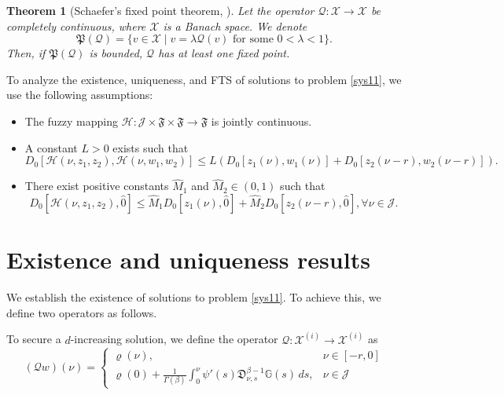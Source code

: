 \documentclass[10pt,a4paper]{amsart}
\numberwithin{equation}{section}
\newtheorem{theorem}[theo]{Theorem}
\begin{document}
\begin{theorem}[Schaefer's fixed point theorem, \cite{smar}] \label{theo3}
Let the operator $\mathcal{Q}: \mathcal{X} \to \mathcal{X}$ be completely continuous, 
where $\mathcal{X}$ is a Banach space. We denote
$$
\mathfrak{P}(\mathcal{Q})=\{v \in \mathcal{X}
\mid v=\lambda \mathcal{Q}(v) \text { for some } 0<\lambda<1\} .
$$
Then, if $\mathfrak{P}(\mathcal{Q})$ is bounded, $\mathcal{Q}$ has at least one fixed 
point.
\end{theorem}


To analyze the existence, uniqueness, and FTS of solutions to problem \eqref{sys11}, 
we use the following assumptions:
\begin{itemize}
\item[(A1)] The fuzzy mapping \(\mathcal{H} : \mathcal{J} \times \mathfrak{F} 
\times \mathfrak{F} \to \mathfrak{F}\) is jointly continuous.

\item[(A2)] A constant \(L > 0\) exists such that
$$
D_0[\mathcal{H}(\nu , z_{1}, z_{2}), \mathcal{H}(\nu , w_{1}, w_{2})] \leq L(D_0[z_{1}(\nu ), w_{1}(\nu )]+D_0[z_{2}(\nu - r), w_{2}(\nu - r)]).
$$

\item[(A3)] There exist positive constants $\hat{M}_{1}$ and $\hat{M}_{2} \in(0,1)$ 
such that
$$
D_0[\mathcal{H}(\nu , z_{1}, z_{2}), \hat{0}] \leq \hat{M}_{1} D_0[z_{1}(\nu ), \hat{0}]+\hat{M}_{2} D_0[z_{2}(\nu - r), \hat{0}], \forall \nu \in\mathcal{J}.
$$
\end{itemize}

\section{Existence and uniqueness results}
We establish the existence of solutions to problem \eqref{sys11}. 
To achieve this, we define two operators as follows.

To secure a \(d\)-increasing solution, we define the operator 
\(\mathcal{Q} : \mathcal{X}^{(i)} \to \mathcal{X}^{(i)}\) as
\begin{equation} \label{sys31}
(\mathcal{Q} w)(\nu )=\begin{cases}
\varrho(\nu ), & \nu \in[- r, 0] \tag{3.1}\\
\varrho(0)+\frac{1}{\Gamma(\beta)} \int_0^{\nu }
\psi'(s)\mathfrak{D}_{\nu ,s}^{\beta-1} \mathbb{G}(s)\,ds, & \nu \in\mathcal{J}
\end{cases}
\end{equation}
\end{document}
